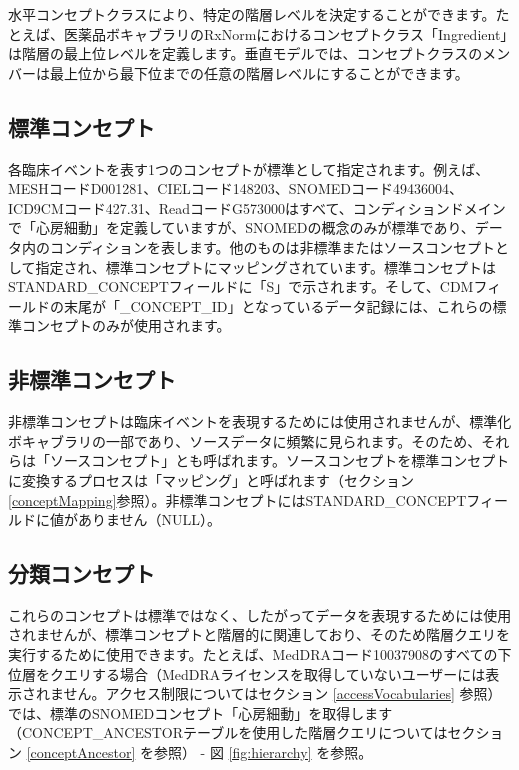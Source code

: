 \documentclass[
  11pt]{book}
\theoremstyle{definition}
\theoremstyle{definition}
\theoremstyle{definition}
\theoremstyle{definition}
\theoremstyle{remark}
\begin{document}
水平コンセプトクラスにより、特定の階層レベルを決定することができます。たとえば、医薬品ボキャブラリのRxNormにおけるコンセプトクラス「Ingredient」は階層の最上位レベルを定義します。垂直モデルでは、コンセプトクラスのメンバーは最上位から最下位までの任意の階層レベルにすることができます。

\subsection{標準コンセプト}\label{standardConcepts}

各臨床イベントを表す1つのコンセプトが標準として指定されます。例えば、MESHコードD001281、CIELコード148203、SNOMEDコード49436004、ICD9CMコード427.31、ReadコードG573000はすべて、コンディションドメインで「心房細動」を定義していますが、SNOMEDの概念のみが標準であり、データ内のコンディションを表します。他のものは非標準またはソースコンセプトとして指定され、標準コンセプトにマッピングされています。標準コンセプトはSTANDARD\_CONCEPTフィールドに「S」で示されます。そして、CDMフィールドの末尾が「\_CONCEPT\_ID」となっているデータ記録には、これらの標準コンセプトのみが使用されます。 

\subsection{非標準コンセプト}\label{ux975eux6a19ux6e96ux30b3ux30f3ux30bbux30d7ux30c8}

非標準コンセプトは臨床イベントを表現するためには使用されませんが、標準化ボキャブラリの一部であり、ソースデータに頻繁に見られます。そのため、それらは「ソースコンセプト」とも呼ばれます。ソースコンセプトを標準コンセプトに変換するプロセスは「マッピング」と呼ばれます（セクション \ref{conceptMapping}参照）。非標準コンセプトにはSTANDARD\_CONCEPTフィールドに値がありません（NULL）。

\subsection{分類コンセプト}\label{ux5206ux985eux30b3ux30f3ux30bbux30d7ux30c8}

これらのコンセプトは標準ではなく、したがってデータを表現するためには使用されませんが、標準コンセプトと階層的に関連しており、そのため階層クエリを実行するために使用できます。たとえば、MedDRAコード10037908のすべての下位層をクエリする場合（MedDRAライセンスを取得していないユーザーには表示されません。アクセス制限についてはセクション \ref{accessVocabularies} 参照）では、標準のSNOMEDコンセプト「心房細動」を取得します（CONCEPT\_ANCESTORテーブルを使用した階層クエリについてはセクション \ref{conceptAncestor} を参照） - 図 \ref{fig:hierarchy} を参照。 
\end{document}
